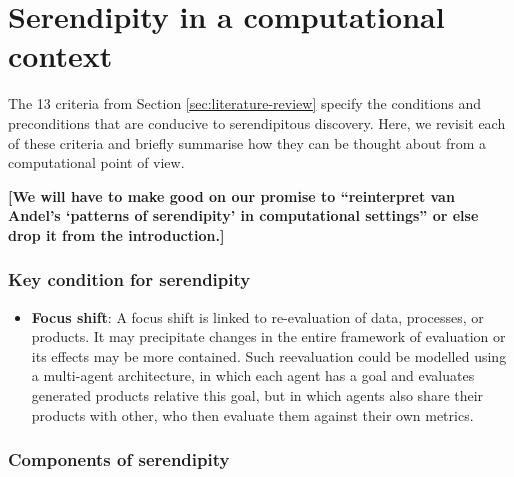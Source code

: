 \section{Serendipity in a computational context} \label{sec:computational-serendipity}

The 13 criteria from Section \ref{sec:literature-review}
specify the conditions and preconditions that are conducive to
serendipitous discovery.  Here, we revisit each of these criteria and
briefly summarise how they can be thought about from a computational
point of view.

\textbf{[We will have to make good on our promise to ``reinterpret van
    Andel's `patterns of serendipity' in computational settings'' or
    else drop it from the introduction.]}

\subsubsection*{Key condition for serendipity}

\begin{itemize}
\item \textbf{Focus shift}: A focus shift is linked to re-evaluation
  of data, processes, or products.  It may precipitate changes in the
  entire framework of evaluation or its effects may be more contained.
  Such reevaluation could be modelled using a multi-agent
  architecture, in which each agent has a goal and evaluates generated
  products relative this goal, but in which agents also share their
  products with other, who then evaluate them against their own
  metrics.
\end{itemize}

\subsubsection*{Components of serendipity}

